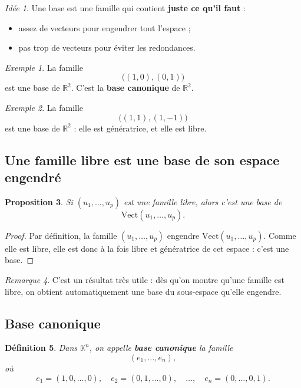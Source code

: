 \documentclass[11pt,a4paper]{article}
\newtheorem{definition}{Définition}[section]
\newtheorem{proposition}[definition]{Proposition}
\theoremstyle{remark}
\newtheorem{remarque}[definition]{Remarque}
\newtheorem{exemple}[definition]{Exemple}
\newtheorem*{idee}{Idée}
\newcommand{\R}{\mathbb{R}}
\newcommand{\K}{\mathbb{K}}
\newcommand{\Vect}{\mathrm{Vect}}
\begin{document}
\begin{idee}
Une base est une famille qui contient \textbf{juste ce qu’il faut} :
\begin{itemize}
    \item assez de vecteurs pour engendrer tout l’espace ;
    \item pas trop de vecteurs pour éviter les redondances.
\end{itemize}
\end{idee}

\begin{exemple}
La famille
\[
\big((1,0),(0,1)\big)
\]
est une base de \(\R^2\). C’est la \textbf{base canonique} de \(\R^2\).
\end{exemple}

\begin{exemple}
La famille
\[
\big((1,1),(1,-1)\big)
\]
est une base de \(\R^2\) : elle est génératrice, et elle est libre.
\end{exemple}

\subsection{Une famille libre est une base de son espace engendré}

\begin{proposition}
Si \((u_1,\dots,u_p)\) est une famille libre, alors c’est une base de
\[
\Vect(u_1,\dots,u_p).
\]
\end{proposition}

\begin{proof}
Par définition, la famille \((u_1,\dots,u_p)\) engendre \(\Vect(u_1,\dots,u_p)\). Comme elle est libre, elle est donc à la fois libre et génératrice de cet espace : c’est une base.
\end{proof}

\begin{remarque}
C’est un résultat très utile : dès qu’on montre qu’une famille est libre, on obtient automatiquement une base du sous-espace qu’elle engendre.
\end{remarque}

\subsection{Base canonique}

\begin{definition}
Dans \(\K^n\), on appelle \textbf{base canonique} la famille
\[
(e_1,\dots,e_n),
\]
où
\[
e_1=(1,0,\dots,0),\quad e_2=(0,1,\dots,0),\quad \dots,\quad e_n=(0,\dots,0,1).
\]
\end{definition}
\end{document}
